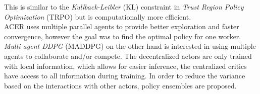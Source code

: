 	This is similar to the \textit{Kullback-Leibler} (KL) constraint in \textit{Trust Region Policy Optimization} (TRPO) \cite{Schulman2015} but is computationally more efficient.\\	
	ACER uses multiple parallel agents to provide better exploration and faster convergence, however the goal was to find the optimal policy for one worker. 
	\textit{Multi-agent DDPG} (MADDPG) \cite{Lowe2017} on the other hand is interested in using multiple agents to collaborate and/or compete. 
	The decentralized actors are only trained with local information, which allows for easier inference, the centralized critics have access to all information during training. 
	In order to reduce the variance based on the interactions with other actors, policy ensembles are proposed.
		
